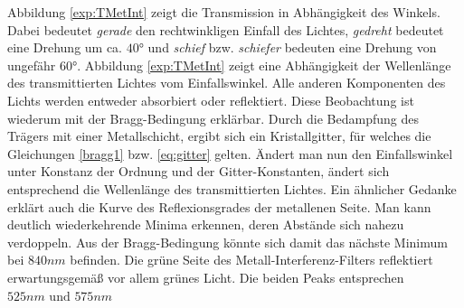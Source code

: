         Abbildung \ref{exp:TMetInt} zeigt die Transmission in Abhängigkeit des Winkels. Dabei bedeutet \textit{gerade} den rechtwinkligen Einfall des Lichtes, \textit{gedreht} bedeutet eine Drehung um ca. $40\unit{°}$ und \textit{schief} bzw. \textit{schiefer} bedeuten eine Drehung von ungefähr $60\unit{°}$. Abbildung \ref{exp:TMetInt} zeigt eine Abhängigkeit der Wellenlänge des transmittierten Lichtes vom Einfallswinkel. Alle anderen Komponenten des Lichts werden entweder absorbiert oder reflektiert. Diese Beobachtung ist wiederum mit der Bragg-Bedingung erklärbar. Durch die Bedampfung des Trägers mit einer Metallschicht, ergibt sich ein Kristallgitter, für welches die Gleichungen \ref{bragg1} bzw. \ref{eq:gitter} gelten. Ändert man nun den Einfallswinkel unter Konstanz der Ordnung und der Gitter-Konstanten, ändert sich entsprechend die Wellenlänge des transmittierten Lichtes.
        Ein ähnlicher Gedanke erklärt auch die Kurve des Reflexionsgrades der metallenen Seite. Man kann deutlich wiederkehrende Minima erkennen, deren Abstände sich nahezu verdoppeln. Aus der Bragg-Bedingung könnte sich damit das nächste Minimum bei $840\unit{nm}$ befinden.
        Die grüne Seite des Metall-Interferenz-Filters reflektiert erwartungsgemäß vor allem grünes Licht. Die beiden Peaks entsprechen $525\unit{nm} \text{ und } 575\unit{nm}$
